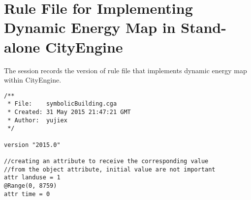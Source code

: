 \chapter{Rule File for Implementing Dynamic Energy Map in Stand-alone
  CityEngine} %

\label{AppendixB} %


\makeatletter
\def\verbatim@font{\linespread{1}\tiny\ttfamily}
\makeatother
The session records the version of rule file that implements dynamic
energy map within CityEngine.

\begin{multicols}{2}
\begin{verbatim}
/**
 * File:    symbolicBuilding.cga
 * Created: 31 May 2015 21:47:21 GMT
 * Author:  yujiex
 */

version "2015.0"

//creating an attribute to receive the corresponding value 
//from the object attribute, initial value are not important
attr landuse = 1
@Range(0, 8759)
attr time = 0


\end{verbatim}
\end{multicols}
